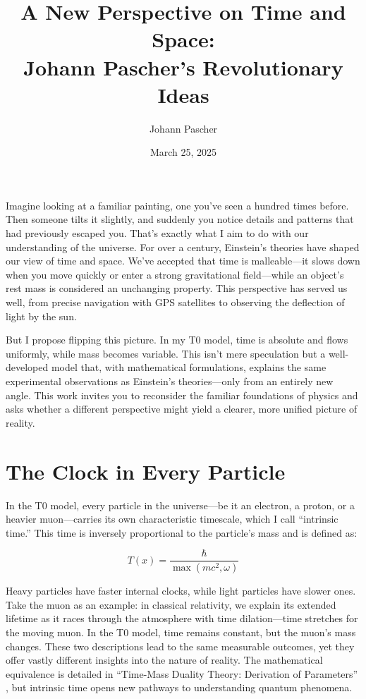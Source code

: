 \documentclass[a4paper,12pt]{article}
\title{A New Perspective on Time and Space: \\Johann Pascher’s Revolutionary Ideas}
\author{Johann Pascher}
\date{March 25, 2025}
\newcommand{\Tfield}{T(x)}
\begin{document}
	
	\maketitle
	
	Imagine looking at a familiar painting, one you’ve seen a hundred times before. Then someone tilts it slightly, and suddenly you notice details and patterns that had previously escaped you. That’s exactly what I aim to do with our understanding of the universe. For over a century, Einstein’s theories have shaped our view of time and space. We’ve accepted that time is malleable—it slows down when you move quickly or enter a strong gravitational field—while an object’s rest mass is considered an unchanging property. This perspective has served us well, from precise navigation with GPS satellites to observing the deflection of light by the sun.
	
	But I propose flipping this picture. In my T0 model, time is absolute and flows uniformly, while mass becomes variable. This isn’t mere speculation but a well-developed model that, with mathematical formulations, explains the same experimental observations as Einstein’s theories—only from an entirely new angle. This work invites you to reconsider the familiar foundations of physics and asks whether a different perspective might yield a clearer, more unified picture of reality.
	
	\section{The Clock in Every Particle}
	
	In the T0 model, every particle in the universe—be it an electron, a proton, or a heavier muon—carries its own characteristic timescale, which I call “intrinsic time.” This time is inversely proportional to the particle’s mass and is defined as:
	
	\begin{equation}
		\Tfield = \frac{\hbar}{\max(m c^2, \omega)}
	\end{equation}
	
	Heavy particles have faster internal clocks, while light particles have slower ones. Take the muon as an example: in classical relativity, we explain its extended lifetime as it races through the atmosphere with time dilation—time stretches for the moving muon. In the T0 model, time remains constant, but the muon’s mass changes. These two descriptions lead to the same measurable outcomes, yet they offer vastly different insights into the nature of reality. The mathematical equivalence is detailed in “Time-Mass Duality Theory: Derivation of Parameters” \cite{pascher_params_2025}, but intrinsic time opens new pathways to understanding quantum phenomena.
	
\end{document}
